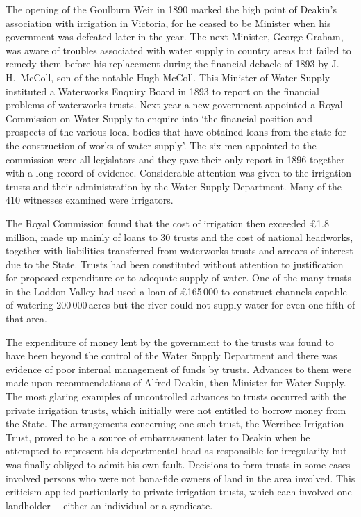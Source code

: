 The opening of the Goulburn Weir  in 1890
marked the high point of Deakin's  association with
irrigation in Victoria, for he ceased to be Minister when his
government was defeated later in the year.  The next Minister, George
Graham,  was aware of troubles associated with water
supply in country areas but failed to remedy them before his
replacement during the financial debacle of 1893 by
J.\,H.~McColl,  son of the notable Hugh McColl.
This Minister of Water Supply instituted a Waterworks Enquiry Board in
1893 to report on the financial problems of waterworks
trusts.  Next year a new government appointed a Royal Commission on
Water Supply  to
enquire into `the financial position and prospects of
the various local bodies that have obtained loans from the state for
the construction of works of water supply'. The six men appointed to
the commission were all legislators and they gave their only report in
1896 together with a long record of evidence.  Considerable attention
was given to the irrigation trusts and their administration by the
Water Supply Department.  Many of the 410 witnesses examined were
irrigators.

The Royal Commission found that the cost of irrigation then exceed\-ed
\pounds1.8 million, made up mainly of loans to 30 trusts and the cost
of national headworks, together with liabilities transferred from
waterworks trusts and arrears of interest due to the State.  Trusts
had been constituted without attention to justification for proposed
expenditure or to adequate supply of water.  One of the many trusts in
the Loddon Valley  had used a loan of
\pounds165\,000 to construct channels
capable of watering 200\,000\,acres but the river could not supply
water for even one-fifth of that area.

The expenditure of money lent by the government to the trusts was
found to have been beyond the control of the Water Supply Department
and there was evidence of poor internal management of funds by trusts.
Advances to them were made upon recommendations of Alfred Deakin,
  then Minister for Water Supply.  The most glaring
examples of uncontrolled advances to trusts occurred with the private
irrigation trusts, which initially were not entitled to borrow money
from the State.  The arrangements concerning one such trust, the
Werribee Irrigation Trust,  proved to
be a source of embarrassment later to Deakin when he attempted to
represent his departmental head as responsible for irregularity but
was finally obliged to admit his own fault.  Decisions to form trusts
in some cases involved persons who were not bona-fide owners of land
in the area involved.  This criticism applied particularly to private
irrigation trusts, which each involved one landholder\,---\,either an
individual or a syndicate.

